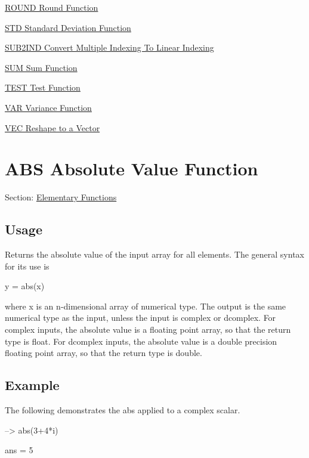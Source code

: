 \begin{DoxyItemize}
\item \hyperlink{elementary_round}{R\-O\-U\-N\-D Round Function}  
\item \hyperlink{elementary_std}{S\-T\-D Standard Deviation Function}  
\item \hyperlink{elementary_sub2ind}{S\-U\-B2\-I\-N\-D Convert Multiple Indexing To Linear Indexing}  
\item \hyperlink{elementary_sum}{S\-U\-M Sum Function}  
\item \hyperlink{elementary_test}{T\-E\-S\-T Test Function}  
\item \hyperlink{elementary_var}{V\-A\-R Variance Function}  
\item \hyperlink{elementary_vec}{V\-E\-C Reshape to a Vector}  
\end{DoxyItemize}\hypertarget{elementary_abs}{}\section{A\-B\-S Absolute Value Function}\label{elementary_abs}
Section\-: \hyperlink{sec_elementary}{Elementary Functions} \hypertarget{vtkwidgets_vtkxyplotwidget_Usage}{}\subsection{Usage}\label{vtkwidgets_vtkxyplotwidget_Usage}
Returns the absolute value of the input array for all elements. The general syntax for its use is \begin{DoxyVerb}   y = abs(x)
\end{DoxyVerb}
 where {\ttfamily x} is an {\ttfamily n}-\/dimensional array of numerical type. The output is the same numerical type as the input, unless the input is {\ttfamily complex} or {\ttfamily dcomplex}. For {\ttfamily complex} inputs, the absolute value is a floating point array, so that the return type is {\ttfamily float}. For {\ttfamily dcomplex} inputs, the absolute value is a double precision floating point array, so that the return type is {\ttfamily double}. \hypertarget{variables_struct_Example}{}\subsection{Example}\label{variables_struct_Example}
The following demonstrates the {\ttfamily abs} applied to a complex scalar.


\begin{DoxyVerbInclude}
--> abs(3+4*i)

ans = 
 5 
\end{DoxyVerbInclude}


